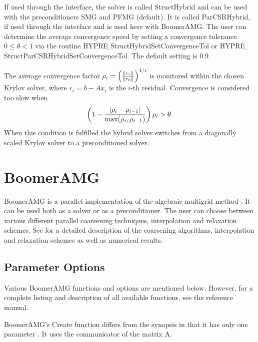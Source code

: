 If used through the  interface, the solver is called StructHybrid
and can be used with the preconditioners SMG and PFMG (default).
It is called ParCSRHybrid, if used through the  interface and is used here
with BoomerAMG.
The user can determine the average convergence speed by setting a convergence tolerance $0 \leq \theta
< 1$
via the routine HYPRE$\_$StructHybridSetConvergenceTol or HYPRE$\_$StructParCSRHybridSetConvergenceTol.
The default setting is 0.9.

The average convergence factor $\rho_i = \left({{\| r_i \|} \over {\| r_0 \|}}\right)^{1/i}$ is
monitored within the chosen Krylov solver, where $r_i = b - Ax_{i}$ is the $i$-th residual.
Convergence is considered too slow when
\begin{equation}
\left( 1 - {{|\rho_i - \rho_{i-1}|} \over { \max(\rho_i, \rho_{i-1})}} \right) \rho_i > \theta .
\end{equation}
When this condition is fulfilled the hybrid solver switches from a diagonally scaled 
Krylov solver to a preconditioned solver.


\section{BoomerAMG}

BoomerAMG is a parallel implementation of the algebraic multigrid 
method \cite{Ruge_Stueben_1987}. 
It can be used
both as a solver or as a preconditioner.  The user can choose between various
different parallel coarsening techniques, interpolation and relaxation schemes.
See
\cite{VEHenson_UMYang_2002,UMYang_2005} for a detailed description of the 
coarsening
algorithms, interpolation and relaxation schemes as well as numerical results.  

\subsection{Parameter Options}

Various BoomerAMG functions and options are mentioned below. However, for a complete
listing and description of all available functions, see the reference manual.


BoomerAMG's Create function differs from the synopsis in that it has only one parameter
. It uses the communicator 
of the matrix A.

